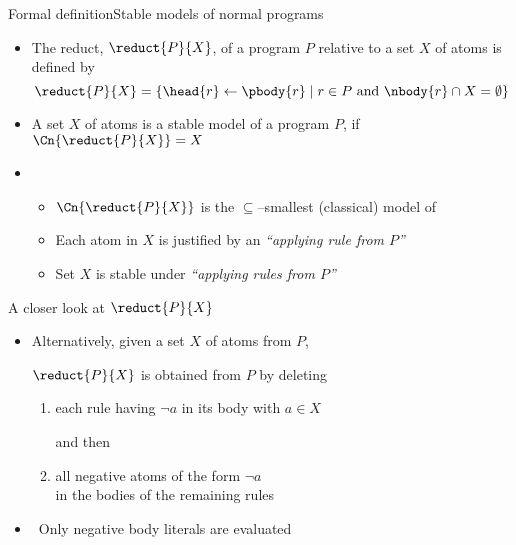 \begin{frame}{Formal definition}{Stable models of normal programs}

  \begin{itemize}
  \item <1-> The \alert{reduct}, $\reduct{P}{X}$, of a program $P$ relative to
    a set $X$ of atoms is defined by
    \[
    \reduct{P}{X}
    =
    \{\head{r}\leftarrow\pbody{r} \mid r\in P \text{ and } \nbody{r}\cap X=\emptyset\}
    \]

  \item <2-> A set $X$ of atoms is a \alert{stable model} of a program $P$,
    if $\Cn{\reduct{P}{X}}=X$
    \bigskip
    \bigskip
  \item<3-> 
    \begin{itemize}
    \item<3-> $\Cn{\reduct{P}{X}}$ is the $\subseteq$--smallest (classical) model of 
      \medskip
    \item<4-> Each atom in $X$ is justified by an \emph{``applying rule from $P$''}
    \item<4-> Set $X$ is \alert{stable} under \emph{``applying rules from $P$''}
    \end{itemize}
  \end{itemize}
\end{frame}
\begin{frame}{A closer look at ${\reduct{P}{X}}$}

  \bigskip
  \begin{itemize}
  \item<1->
    Alternatively, given a set $X$ of atoms from $P$,

    \bigskip

    $\reduct{P}{X}$ is obtained from $P$ by \alert<1>{deleting}

    \medskip

    \begin{enumerate}\normalsize
    \item each \alert<1>{rule} having \alert<2>{$\neg a$} in its body with $a\in X$

      and then

      \smallskip

    \item all \alert<1>{negative atoms} of the form \alert<2>{$\neg a$}  \\
      in the bodies of the remaining rules
    \end{enumerate}
    \bigskip
  \item<2->  \ Only \alert<2>{negative body literals} are evaluated
  \end{itemize}
\end{frame}
%
